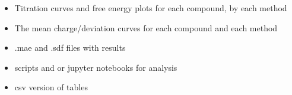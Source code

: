 \documentclass[9pt,lineno,final]{elife}
\begin{document}
\begin{itemize}
	\item Titration curves and free energy plots for each compound, by each method
	\item The mean charge/deviation curves for each compound and each method
	\item .mae and .sdf files with results
	\item scripts and or jupyter notebooks for analysis
	\item csv version of tables
\end{itemize}
\end{document}
